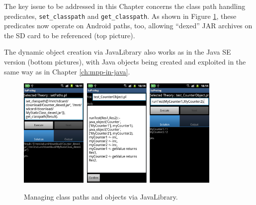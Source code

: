 The key issue to be addressed in this Chapter concerns the class path handling predicates, \texttt{set\_classpath} and \texttt{get\_classpath}.
As shown in Figure \ref{fig:android12}, these predicates now operate on Android paths, too, allowing ``dexed'' JAR archives on the SD card to be referenced (top picture).

The dynamic object creation via JavaLibrary also works as in the Java SE version (bottom pictures), with Java objects being created and exploited in the same way as in Chapter \ref{ch:mpp-in-java}.
%
\begin{figure}
\centering
  \includegraphics[height=200px]{images/android12.png}~\includegraphics[height=200px]{images/android13.png}
  \caption{Managing class paths and objects via JavaLibrary.}\label{fig:android12}
\end{figure}


